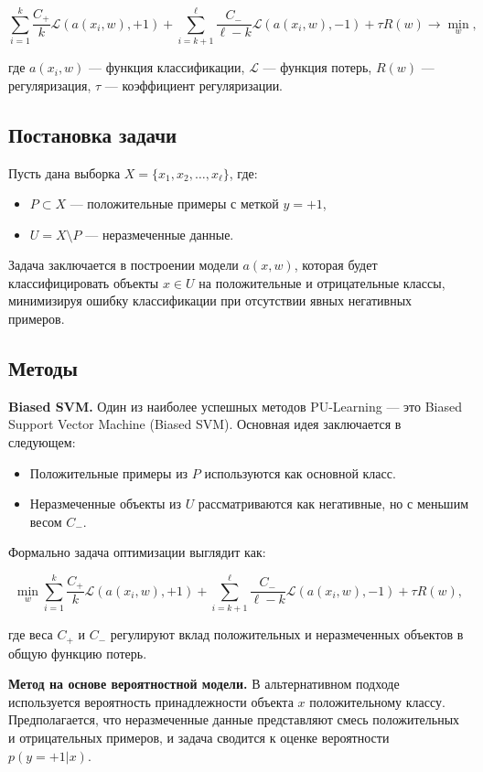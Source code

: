 \[
    \sum_{i=1}^k \frac{C_+}{k} \mathcal{L}(a(x_i, w), +1) + \sum_{i=k+1}^\ell \frac{C_-}{\ell - k} \mathcal{L}(a(x_i, w), -1) + \tau R(w) \to \min_w,
\]

где \( a(x_i, w) \) — функция классификации, \( \mathcal{L} \) — функция потерь, \( R(w) \) — регуляризация, \( \tau \) — коэффициент регуляризации.

\subsection{Постановка задачи}

Пусть дана выборка \( X = \{x_1, x_2, \dots, x_\ell\} \), где:
\begin{itemize}
    \item \( P \subset X \) — положительные примеры с меткой \( y = +1 \),
    \item \( U = X \setminus P \) — неразмеченные данные.
\end{itemize}

Задача заключается в построении модели \( a(x, w) \), которая будет классифицировать объекты \( x \in U \) на положительные и отрицательные классы, минимизируя ошибку классификации при отсутствии явных негативных примеров.

\subsection{Методы}

\textbf{Biased SVM.} Один из наиболее успешных методов PU-Learning — это Biased Support Vector Machine (Biased SVM). Основная идея заключается в следующем:
\begin{itemize}
    \item Положительные примеры из \( P \) используются как основной класс.
    \item Неразмеченные объекты из \( U \) рассматриваются как негативные, но с меньшим весом \( C_- \).
\end{itemize}

Формально задача оптимизации выглядит как:

\[
    \min_w \sum_{i=1}^k \frac{C_+}{k} \mathcal{L}(a(x_i, w), +1) + \sum_{i=k+1}^\ell \frac{C_-}{\ell - k} \mathcal{L}(a(x_i, w), -1) + \tau R(w),
\]

где веса \( C_+ \) и \( C_- \) регулируют вклад положительных и неразмеченных объектов в общую функцию потерь.

\textbf{Метод на основе вероятностной модели.} В альтернативном подходе используется вероятность принадлежности объекта \( x \) положительному классу. Предполагается, что неразмеченные данные представляют смесь положительных и отрицательных примеров, и задача сводится к оценке вероятности \( p(y = +1 | x) \).

